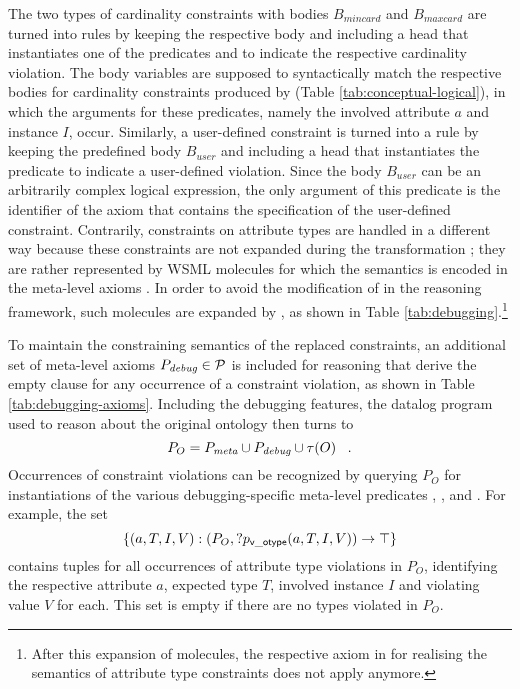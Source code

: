 The two types of cardinality constraints with bodies $B_{mincard}$
and $B_{maxcard}$ are turned into rules by keeping the respective
body and including a head that instantiates one of the predicates
\pvmincard and \pvmaxcard to indicate the respective cardinality
violation. The body variables are supposed to syntactically match
the respective bodies for cardinality constraints produced by
\transax (Table \ref{tab:conceptual-logical}), in which the
arguments for these predicates, namely the involved attribute $a$
and instance $I$, occur. Similarly, a user-defined constraint is
turned into a rule by keeping the predefined body $B_{user}$ and
including a head that instantiates the predicate \pvuser to
indicate a user-defined violation. Since the body $B_{user}$ can
be an arbitrarily complex logical expression, the only argument of
this predicate is the identifier \axiomid of the axiom that
contains the  specification of the user-defined constraint.
Contrarily, constraints on attribute types are handled in a
different way because these constraints are not expanded during
the transformation \transax ; they are rather represented by WSML
 molecules for which the semantics is encoded in the
meta-level axioms \mlaxioms. In order to avoid the modification of
\mlaxioms in the reasoning framework, such molecules are expanded
by \transdebug, as shown in Table
\ref{tab:debugging}.\footnote{After this expansion of
 molecules, the respective axiom in \mlaxioms for
realising the semantics of attribute type constraints does not
apply anymore.}

To maintain the constraining semantics of the replaced
constraints, an additional set of meta-level axioms $\debugaxioms
\in \mathcal{P}$ is included for reasoning that derive the empty
clause for any occurrence of a constraint violation, as shown in
Table \ref{tab:debugging-axioms}. Including the debugging
features, the datalog program used to reason about the original
ontology then turns to
\begin{displaymath}
    P_O = \mlaxioms \cup \debugaxioms \cup \tau(O) \;\;\;.
\end{displaymath}
Occurrences of constraint violations can be recognized by querying
$P_O$ for instantiations of the various debugging-specific
meta-level predicates \pvotype, \pvmincard, \pvmaxcard and
\pvuser. For example, the set
\begin{displaymath}
    \{(a,T,I,V) : (P_O , ?p_{\mathrm{\sf v\_otype}}(a,T,I,V)) \rightarrow \top \}
\end{displaymath}
contains tuples for all occurrences of attribute type violations
in $P_O$, identifying the respective attribute $a$, expected type
$T$, involved instance $I$ and violating value $V$ for each. This
set is empty if there are no types violated in $P_O$.


